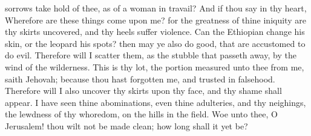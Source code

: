 sorrows take hold of thee, as of a woman in travail? And if thou say in thy heart, Wherefore are these things come upon me? for the greatness of thine iniquity are thy skirts uncovered, and thy heels suffer violence. Can the Ethiopian change his skin, or the leopard his spots? then may ye also do good, that are accustomed to do evil. Therefore will I scatter them, as the stubble that passeth away, by the wind of the wilderness. This is thy lot, the portion measured unto thee from me, saith Jehovah; because thou hast forgotten me, and trusted in falsehood. Therefore will I also uncover thy skirts upon thy face, and thy shame shall appear. I have seen thine abominations, even thine adulteries, and thy neighings, the lewdness of thy whoredom, on the hills in the field. Woe unto thee, O Jerusalem! thou wilt not be made clean; how long shall it yet be? 

